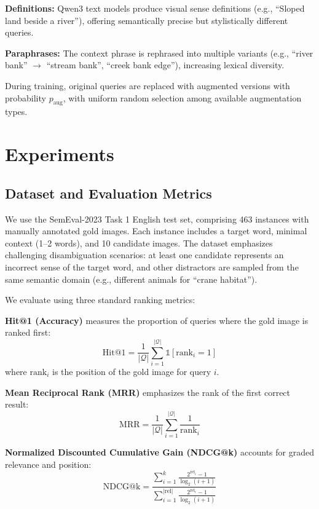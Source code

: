 \documentclass[11pt]{article}
\begin{document}
\textbf{Definitions:} Qwen3 text models produce visual sense definitions (e.g., ``Sloped land beside a river''), offering semantically precise but stylistically different queries.

\textbf{Paraphrases:} The context phrase is rephrased into multiple variants (e.g., ``river bank'' $\rightarrow$ ``stream bank'', ``creek bank edge''), increasing lexical diversity.

During training, original queries are replaced with augmented versions with probability $p_{\text{aug}}$, with uniform random selection among available augmentation types.

\section{Experiments}
\label{sec:experiments}

\subsection{Dataset and Evaluation Metrics}

We use the SemEval-2023 Task 1 English test set, comprising 463 instances with manually annotated gold images. Each instance includes a target word, minimal context (1--2 words), and 10 candidate images. The dataset emphasizes challenging disambiguation scenarios: at least one candidate represents an incorrect sense of the target word, and other distractors are sampled from the same semantic domain (e.g., different animals for ``crane habitat'').

We evaluate using three standard ranking metrics:

\textbf{Hit@1 (Accuracy)} measures the proportion of queries where the gold image is ranked first:
\begin{equation}
\text{Hit@1} = \frac{1}{|\mathcal{Q}|} \sum_{i=1}^{|\mathcal{Q}|} \mathbb{1}[\text{rank}_i = 1]
\end{equation}
where $\text{rank}_i$ is the position of the gold image for query $i$.

\textbf{Mean Reciprocal Rank (MRR)} emphasizes the rank of the first correct result:
\begin{equation}
\text{MRR} = \frac{1}{|\mathcal{Q}|} \sum_{i=1}^{|\mathcal{Q}|} \frac{1}{\text{rank}_i}
\end{equation}

\textbf{Normalized Discounted Cumulative Gain (NDCG@k)} accounts for graded relevance and position:
\begin{equation}
\text{NDCG@k} = \frac{\sum_{i=1}^{k} \frac{2^{\text{rel}_i} - 1}{\log_2(i+1)}}{\sum_{i=1}^{|\text{rel}|} \frac{2^{\text{rel}_i} - 1}{\log_2(i+1)}}
\end{equation}
\end{document}
